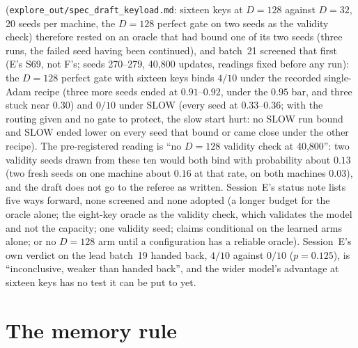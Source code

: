 \documentclass[11pt]{article}
\begin{document}
(\texttt{explore\_out/spec\_draft\_keyload.md}: sixteen keys at $D = 128$ against $D = 32$, 20 seeds per machine, the $D = 128$ perfect gate on two seeds as the validity check) therefore rested on an oracle that had bound one of its two seeds (three runs, the failed seed having been continued), and batch~21 screened that first (E's S69, not F's; seeds 270--279, 40{,}800 updates, readings fixed before any run): the $D = 128$ perfect gate with sixteen keys binds $4/10$ under the recorded single-Adam recipe (three more seeds ended at $0.91$--$0.92$, under the $0.95$ bar, and three stuck near $0.30$) and $0/10$ under SLOW (every seed at $0.33$--$0.36$; with the routing given and no gate to protect, the slow start hurt: no SLOW run bound and SLOW ended lower on every seed that bound or came close under the other recipe). The pre-registered reading is ``no $D = 128$ validity check at 40{,}800'': two validity seeds drawn from these ten would both bind with probability about $0.13$ (two fresh seeds on one machine about $0.16$ at that rate, on both machines $0.03$), and the draft does not go to the referee as written. Session~E's status note lists five ways forward, none screened and none adopted (a longer budget for the oracle alone; the eight-key oracle as the validity check, which validates the model and not the capacity; one validity seed; claims conditional on the learned arms alone; or no $D = 128$ arm until a configuration has a reliable oracle). Session~E's own verdict on the lead batch~19 handed back, $4/10$ against $0/10$ ($p = 0.125$), is ``inconclusive, weaker than handed back'', and the wider model's advantage at sixteen keys has no test it can be put to yet.

\section{The memory rule}
\label{sec:memory}
\end{document}
